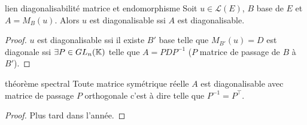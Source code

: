 \begin{proposition}{lien diagonalisabilité matrice et endomorphisme}{}
    Soit $u \in \mathscr L(E)$, $B$ base de $E$ et $A = M_B(u)$. Alors $u$ est diagonalisable ssi $A$ est diagonalisable.
\end{proposition}

\begin{proof}
    $u$ est diagonalisable ssi il existe $B'$ base telle que $M_{B'}(u) = D$ est diagonale
    ssi $\exists P \in GL_n(\mathbb{K})$ telle que $A = P D P^{-1}$ ($P$ matrice de passage de $B$ à $B'$).
\end{proof}

\begin{theoreme}{théorème spectral}{}
    Toute matrice symétrique réelle $A$ est diagonalisable avec matrice de passage $P$ orthogonale
    c'est à dire telle que $P^{-1} = P^\top$.    
\end{theoreme}

\begin{proof}
    Plus tard dans l'année. 
\end{proof}

